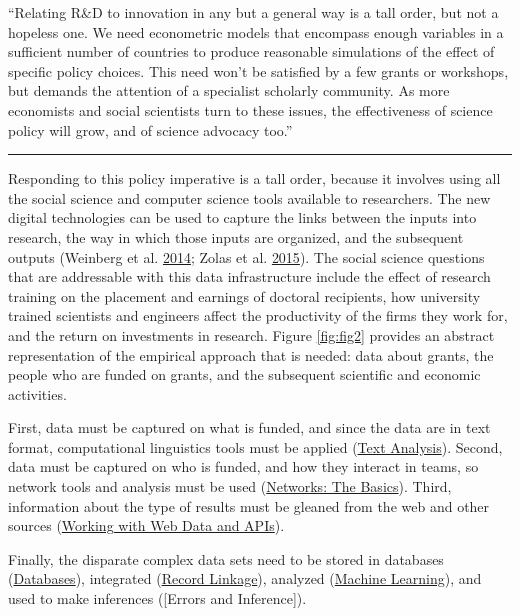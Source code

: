 \documentclass[]{krantz}
\begin{document}
``Relating R\&D to innovation in any but a general way is a tall order,
but not a hopeless one. We need econometric models that encompass enough
variables in a sufficient number of countries to produce reasonable
simulations of the effect of specific policy choices. This need won't be
satisfied by a few grants or workshops, but demands the attention of a
specialist scholarly community. As more economists and social scientists
turn to these issues, the effectiveness of science policy will grow, and
of science advocacy too.''

\begin{center}\rule{0.5\linewidth}{\linethickness}\end{center}

Responding to this policy imperative is a tall order, because it
involves using all the social science and computer science tools
available to researchers. The new digital technologies can be used to
capture the links between the inputs into research, the way in which
those inputs are organized, and the subsequent outputs (Weinberg et al.
\protect\hyperlink{ref-weinberg2014science}{2014}; Zolas et al.
\protect\hyperlink{ref-zolas2015wrapping}{2015}). The social science
questions that are addressable with this data infrastructure include the
effect of research training on the placement and earnings of doctoral
recipients, how university trained scientists and engineers affect the
productivity of the firms they work for, and the return on investments
in research. Figure \ref{fig:fig2} provides an abstract representation
of the empirical approach that is needed: data about grants, the people
who are funded on grants, and the subsequent scientific and economic
activities.

First, data must be captured on what is funded, and since the data are
in text format, computational linguistics tools must be applied
(\protect\hyperlink{chap:text}{Text Analysis}). Second, data must be
captured on who is funded, and how they interact in teams, so network
tools and analysis must be used
(\protect\hyperlink{chap:networks}{Networks: The Basics}). Third,
information about the type of results must be gleaned from the web and
other sources (\protect\hyperlink{chap:web}{Working with Web Data and
APIs}).

Finally, the disparate complex data sets need to be stored in databases
(\protect\hyperlink{chap:db}{Databases}), integrated
(\protect\hyperlink{chap:link}{Record Linkage}), analyzed
(\protect\hyperlink{chap:ml}{Machine Learning}), and used to make
inferences ({[}Errors and Inference{]}).
\end{document}
